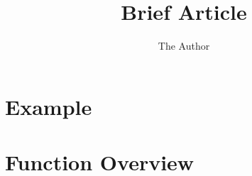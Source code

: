 \documentclass[11pt]{article} %
\title{Brief Article}
\author{The Author}
\begin{document}
\section{Example}

\section{Function Overview}
%
\end{document}
